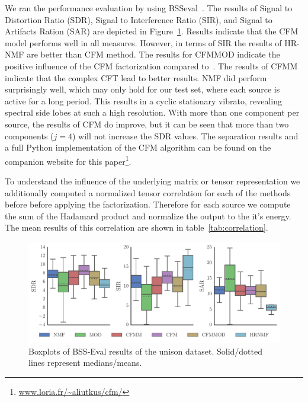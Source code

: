 We ran the performance evaluation by using BSSeval~\cite{Vincentbsseval06}. The results of Signal to Distortion
Ratio (SDR), Signal to Interference Ratio (SIR), and Signal to Artifacts Ration (SAR) are depicted in Figure~\ref{fig:boxplot_overall}. Results indicate that the CFM model performs well in all measures. However, in terms of SIR the results of HR-NMF are better than CFM method. The results for CFMMOD indicate the positive influence of the CFM factorization compared to~\cite{barker2013modulation}.
The results of CFMM indicate that the complex CFT lead to better results. NMF did perform surprisingly well, which may only hold for our test set, where each source is active for a long period. This results in a cyclic stationary vibrato, revealing spectral side lobes at such a high resolution. With more than one component per source, the results of CFM do improve, but it can be seen that more than two components ($j=4$) will not increase the SDR values. The separation results and a full Python implementation of the CFM algorithm can be found on the companion website for this paper\footnote{\url{www.loria.fr/~aliutkus/cfm/}}.

To understand the influence of the underlying matrix or tensor representation we additionally computed a normalized tensor correlation for each of the methods before before applying the factorization. Therefore for each source we compute the sum of the Hadamard product and normalize the output to the it's energy. The mean results of this correlation are shown in table~\ref{tab:correlation}.

\begin{figure}[ht!]
\centering
		\includegraphics[width=0.90\columnwidth]{Chapters/commonfate/figures/boxplot.pdf}
\caption{Boxplots of BSS-Eval results of the unison dataset. Solid/dotted lines represent medians/means.}
\label{fig:boxplot_overall}
\end{figure}

